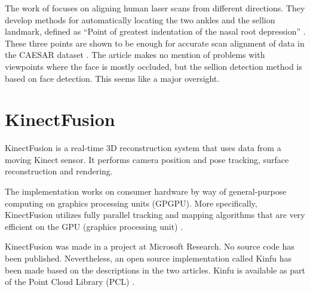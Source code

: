 The work of \citet{hirshbergc2011evaluating} focuses on aligning human laser scans from different directions. They develop methods for automatically locating the two ankles and the sellion landmark, defined as ``Point of greatest indentation of the nasal root depression'' \citep{blackwell2002civilian}. These three points are shown to be enough for accurate scan alignment of data in the CAESAR dataset \citep{robinette2002civilian}. The article makes no mention of problems with viewpoints where the face is mostly occluded, but the sellion detection method is based on face detection. This seems like a major oversight.


\section{KinectFusion}

KinectFusion is a real-time 3D reconstruction system that uses data from a moving Kinect sensor. It performs camera position and pose tracking, surface reconstruction and rendering. \citep{izadi2011kinectfusion}

The implementation works on consumer hardware by way of general-purpose computing on graphics processing units (GPGPU). More specifically, KinectFusion utilizes fully parallel tracking and mapping algorithms that are very efficient on the GPU (graphics processing unit) \citep{newcombe2011kinectfusion}.



KinectFusion was made in a project at Microsoft Research. No source code has been published. Nevertheless, an open source implementation called Kinfu has been made based on the descriptions in the two articles. Kinfu is available as part of the Point Cloud Library (PCL) \citep{PCL}.

